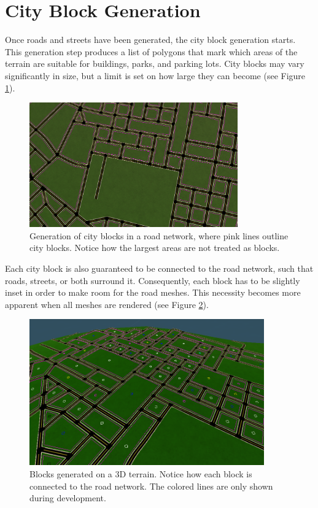 \section{City Block Generation}

Once roads and streets have been generated, the city block generation starts.
This generation step produces a list of polygons that mark which areas of the terrain are suitable for buildings, parks, and parking lots.
City blocks may vary significantly in size, but a limit is set on how large they can become (see Figure \ref{fig:results_blockgen1}).

\begin{figure}[h!]
  \centering

  \includegraphics[width=0.8\textwidth]{figure/results_blockgen1.png}
  \caption{Generation of city blocks in a road network, where pink lines outline city blocks. Notice how the largest areas are not treated as blocks.}

  \label{fig:results_blockgen1}
\end{figure}

Each city block is also guaranteed to be connected to the road network, such that roads, streets, or both surround it.
Consequently, each block has to be slightly inset in order to make room for the road meshes.
This necessity becomes more apparent when all meshes are rendered (see Figure \ref{fig:results_blockgen2}).

\begin{figure}[h!]
  \centering

  \includegraphics[width=0.9\textwidth]{figure/results_blockgen2.png}
  \caption{Blocks generated on a 3D terrain. Notice how each block is connected to the road network. The colored lines are only shown during development.}

  \label{fig:results_blockgen2}
\end{figure}

